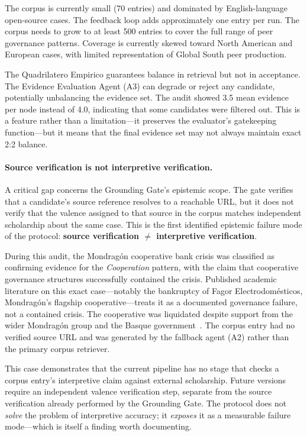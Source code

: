 \documentclass[10pt,twocolumn]{article}
\begin{document}
The corpus is currently small (70 entries) and dominated by English-language open-source cases. The feedback loop adds approximately one entry per run. The corpus needs to grow to at least 500 entries to cover the full range of peer governance patterns. Coverage is currently skewed toward North American and European cases, with limited representation of Global South peer production.

The Quadrilatero Empirico guarantees balance in retrieval but not in acceptance. The Evidence Evaluation Agent (A3) can degrade or reject any candidate, potentially unbalancing the evidence set. The audit showed 3.5 mean evidence per node instead of 4.0, indicating that some candidates were filtered out. This is a feature rather than a limitation---it preserves the evaluator's gatekeeping function---but it means that the final evidence set may not always maintain exact 2:2 balance.

\paragraph{Source verification is not interpretive verification.} A critical gap concerns the Grounding Gate's epistemic scope. The gate verifies that a candidate's source reference resolves to a reachable URL, but it does not verify that the valence assigned to that source in the corpus matches independent scholarship about the same case. This is the first identified epistemic failure mode of the protocol: \textbf{source verification $\neq$ interpretive verification}.

During this audit, the Mondragón cooperative bank crisis was classified as confirming evidence for the \emph{Cooperation} pattern, with the claim that cooperative governance structures successfully contained the crisis. Published academic literature on this exact case---notably the bankruptcy of Fagor Electrodomésticos, Mondragón's flagship cooperative---treats it as a documented governance failure, not a contained crisis. The cooperative was liquidated despite support from the wider Mondragón group and the Basque government~\cite{basterretxea2018}. The corpus entry had no verified source URL and was generated by the fallback agent (A2) rather than the primary corpus retriever.

This case demonstrates that the current pipeline has no stage that checks a corpus entry's interpretive claim against external scholarship. Future versions require an independent valence verification step, separate from the source verification already performed by the Grounding Gate. The protocol does not \emph{solve} the problem of interpretive accuracy; it \emph{exposes} it as a measurable failure mode---which is itself a finding worth documenting.
\end{document}
